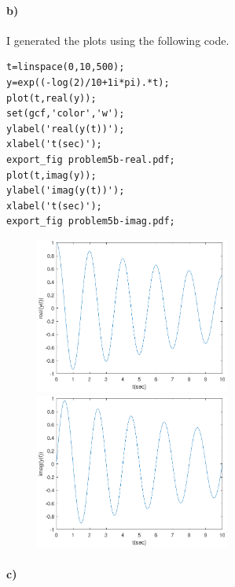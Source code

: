 \documentclass[12pt]{article}
\begin{document}
\paragraph{b)}

I generated the plots using the following code.
\begin{verbatim}
t=linspace(0,10,500);
y=exp((-log(2)/10+1i*pi).*t);
plot(t,real(y));
set(gcf,'color','w');
ylabel('real(y(t))');
xlabel('t(sec)');
export_fig problem5b-real.pdf;
plot(t,imag(y));
ylabel('imag(y(t))');
xlabel('t(sec)');
export_fig problem5b-imag.pdf;
\end{verbatim}
\begin{figure}[H]
    \begin{center}
        \includegraphics[width=2.5in]{problem5b-real.pdf}
        \includegraphics[width=2.5in]{problem5b-imag.pdf}
    \end{center}
\end{figure}

\paragraph{c)}
\end{document}
